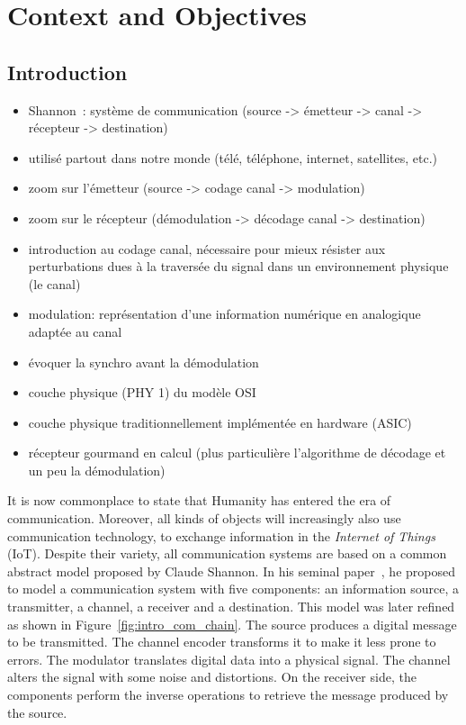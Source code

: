 
\graphicspath{{main/chapter1/fig/}}

\chapter{Context and Objectives}

\minitoccustom

\section{Introduction}

\begin{itemize}
  \item Shannon~\cite{Shannon1948}: système de communication (source -> émetteur
    -> canal -> récepteur -> destination)
  \item utilisé partout dans notre monde (télé, téléphone, internet, satellites,
    etc.)
  \item zoom sur l'émetteur (source -> codage canal -> modulation)
  \item zoom sur le récepteur (démodulation -> décodage canal -> destination)
  \item introduction au codage canal, nécessaire pour mieux résister aux
    perturbations dues à la traversée du signal dans un environnement physique
    (le canal)
  \item modulation: représentation d'une information numérique en analogique
    adaptée au canal
  \item évoquer la synchro avant la démodulation
  \item couche physique (PHY 1) du modèle OSI
  \item couche physique traditionnellement implémentée en hardware (ASIC)
  \item récepteur gourmand en calcul (plus particulière l'algorithme de décodage
    et un peu la démodulation)
\end{itemize}

It is now commonplace to state that Humanity has entered the era of
communication. Moreover, all kinds of objects will increasingly also use
communication technology, to exchange information in the \emph{Internet of
Things} (IoT). Despite their variety, all communication systems are based on a
common abstract model proposed by Claude Shannon. In his seminal
paper~\cite{Shannon1948}, he proposed to model a communication system with five
components: an information source, a transmitter, a channel, a receiver and a
destination. This model was later refined as shown in
Figure~\ref{fig:intro_com_chain}. The source produces a digital message to be
transmitted. The channel encoder transforms it to make it less prone to errors.
The modulator translates digital data into a physical signal. The channel alters
the signal with some noise and distortions. On the receiver side, the components
perform the inverse operations to retrieve the message produced by the source.

